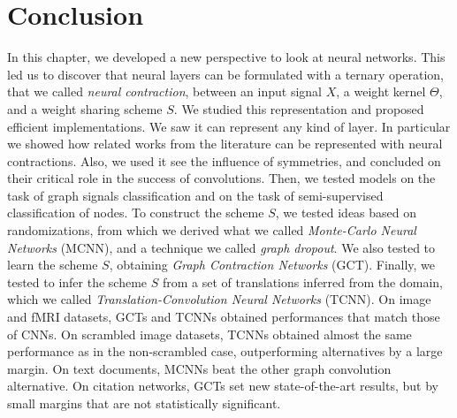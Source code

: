 \section{Conclusion}
\label{sec:3.5}

In this chapter, we developed a new perspective to look at neural networks. This led us to discover that neural layers can be formulated with a ternary operation, that we called \emph{neural contraction}, between an input signal $X$, a weight kernel $\Theta$, and a weight sharing scheme $S$. We studied this representation and proposed efficient implementations. We saw it can represent any kind of layer. In particular we showed how related works from the literature can be represented with neural contractions. Also, we used it see the influence of symmetries, and concluded on their critical role in the success of convolutions. Then, we tested models on the task of graph signals classification and on the task of semi-supervised classification of nodes. To construct the scheme $S$, we tested ideas based on randomizations, from which we derived what we called \emph{Monte-Carlo Neural Networks} (MCNN), and a technique we called \emph{graph dropout}. We also tested to learn the scheme $S$, obtaining \emph{Graph Contraction Networks} (GCT). Finally, we tested to infer the scheme $S$ from a set of translations inferred from the domain, which we called \emph{Translation-Convolution Neural Networks} (TCNN). On image and fMRI datasets, GCTs and TCNNs obtained performances that match those of CNNs. On scrambled image datasets, TCNNs obtained almost the same performance as in the non-scrambled case, outperforming alternatives by a large margin. On text documents, MCNNs beat the other graph convolution alternative. On citation networks, GCTs set new state-of-the-art results, but by small margins that are not statistically significant.